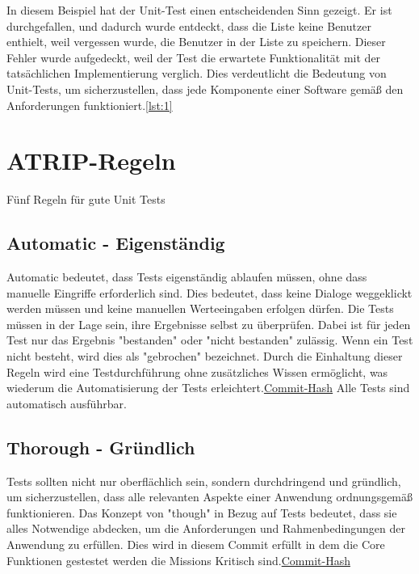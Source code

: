 In diesem Beispiel hat der Unit-Test einen entscheidenden Sinn gezeigt. Er ist durchgefallen, und dadurch wurde entdeckt, dass die Liste keine Benutzer enthielt, weil vergessen wurde, die Benutzer in der Liste zu speichern. Dieser Fehler wurde aufgedeckt, weil der Test die erwartete Funktionalität mit der tatsächlichen Implementierung verglich. Dies verdeutlicht die Bedeutung von Unit-Tests, um sicherzustellen, dass jede Komponente einer Software gemäß den Anforderungen funktioniert.\ref{lst:1}



\section{ATRIP-Regeln}
Fünf Regeln für gute Unit Tests
\subsection*{Automatic - Eigenständig}

Automatic bedeutet, dass Tests eigenständig ablaufen müssen, ohne dass manuelle Eingriffe erforderlich sind. Dies bedeutet, dass keine Dialoge weggeklickt werden müssen und keine manuellen Werteeingaben erfolgen dürfen. Die Tests müssen in der Lage sein, ihre Ergebnisse selbst zu überprüfen. Dabei ist für jeden Test nur das Ergebnis "bestanden" oder "nicht bestanden" zulässig. Wenn ein Test nicht besteht, wird dies als "gebrochen" bezeichnet. Durch die Einhaltung dieser Regeln wird eine Testdurchführung ohne zusätzliches Wissen ermöglicht, was wiederum die Automatisierung der Tests erleichtert.\href{https://github.com/lorenz1702/Spy-Game/commit/9142232564a086007dc335c17d2dc9fa30309729}{Commit-Hash} Alle Tests sind automatisch ausführbar. 


\subsection*{Thorough - Gründlich}
Tests sollten nicht nur oberflächlich sein, sondern durchdringend und gründlich, um sicherzustellen, dass alle relevanten Aspekte einer Anwendung ordnungsgemäß funktionieren. Das Konzept von "though" in Bezug auf Tests bedeutet, dass sie alles Notwendige abdecken, um die Anforderungen und Rahmenbedingungen der Anwendung zu erfüllen. Dies wird in diesem Commit erfüllt in dem die Core Funktionen gestestet werden die Missions Kritisch sind.\href{https://github.com/lorenz1702/Spy-Game/commit/b0692bf0d1c65c3f4af85381358f92dc94f1eeca}{Commit-Hash}

